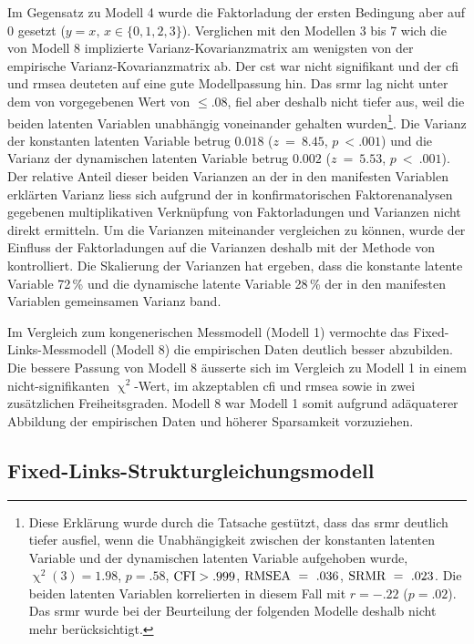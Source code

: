 \documentclass[11pt, twoside, a4paper]{book}		%
\begin{document}
Im Gegensatz zu Modell 4 wurde die Faktorladung der ersten Bedingung aber auf 0 gesetzt ($y=x,\,x\in\{0, 1, 2, 3\}$).
Verglichen mit den Modellen 3 bis 7 wich die von Modell 8 implizierte Var\-ianz-Ko\-var\-ianz\-ma\-trix am wenigsten von der empirische Var\-ianz-Ko\-var\-ianz\-ma\-trix ab. Der \gls{cst} war nicht signifikant und der \gls{cfi} und \gls{rmsea} deuteten auf eine gute Modellpassung hin. 
Das \gls{srmr}  lag nicht unter dem von \citet{Hu1999} vorgegebenen Wert von $\leq.08$, fiel aber deshalb  nicht tiefer aus, weil die beiden latenten Variablen unabhängig voneinander gehalten wurden\footnote{Diese Erklärung wurde durch die Tatsache gestützt, dass das \gls{srmr} deutlich tiefer ausfiel, wenn die Unabhängigkeit zwischen der konstanten latenten Variable und der dynamischen latenten Variable aufgehoben wurde, $\upchi^2(3)=1.98$, $p=.58$, $\textnormal{CFI}>.999$, $\textnormal{RMSEA}~=~.036$, $\textnormal{SRMR}~=~.023$. Die beiden latenten Variablen korrelierten in diesem Fall mit $r=-.22$ ($p=.02$). Das \gls{srmr} wurde bei der Beurteilung der folgenden Modelle deshalb nicht mehr berücksichtigt.}. 
Die Varianz der konstanten latenten Variable betrug $0.018$ ($z~=~8.45$, $p~<.001$) und die Varianz der dynamischen latenten Variable betrug $0.002$ ($z~=~5.53$, $p~<~.001$). 
Der relative Anteil dieser beiden Varianzen an der in den manifesten Variablen erklärten Varianz liess sich aufgrund der in konfirmatorischen Faktorenanalysen gegebenen multiplikativen Verknüpfung von Faktorladungen und Varianzen nicht direkt ermitteln. Um die Varianzen miteinander vergleichen zu können, wurde der Einfluss der Faktorladungen auf die Varianzen deshalb mit der Methode von  \citet{Schweizer2011a} kontrolliert. Die Skalierung der Varianzen hat ergeben, dass die konstante latente Variable 72\,\% und die dynamische latente Variable 28\,\% der in den manifesten Variablen gemeinsamen Varianz band.

Im Vergleich zum kongenerischen Messmodell (Modell 1) vermochte das Fixed-Links-Messmodell (Modell 8) die empirischen Daten deutlich besser abzubilden. Die bessere Passung von Modell 8 äusserte sich im Vergleich zu Modell 1 in einem nicht-signifikanten $\upchi^2$-Wert, im akzeptablen \gls{cfi} und \gls{rmsea} sowie in zwei zusätzlichen Freiheitsgraden. Modell 8 war Modell 1 somit aufgrund adäquaterer Abbildung der empirischen Daten und höherer Sparsamkeit vorzuziehen.

\subsection{Fixed-Links-Struk\-tur\-glei\-chungs\-mo\-dell}
\end{document}
